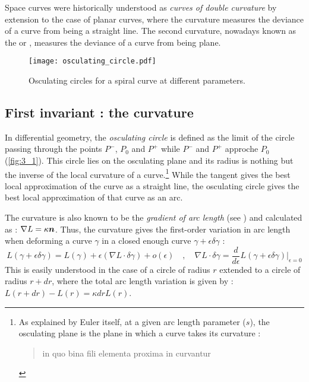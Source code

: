 Space curves were historically understood as \emph{curves of double curvature} by extension to the case of planar curves, where the curvature measures the deviance of a curve from being a straight line. The second curvature, nowadays known as the  or , measures the deviance of a curve from being plane. 


\begin{figure}[t]
	\centering
	\texttt{[image: osculating\_circle.pdf]}
	\caption{Osculating circles for a spiral curve at different parameters.}
	\label{fig:3_2}
\end{figure}

\subsection{First invariant : the curvature}\label{sec:curvature}
In differential geometry, the \emph{osculating circle} is defined as the limit of the circle passing through the points $P^-$, $P_0$ and $P^+$ while $P^-$ and $P^+$ approche $P_0$ (\cref{fig:3_1}). This circle lies on the osculating plane and its radius is nothing but the inverse of the local curvature of a curve.\footnote{ As explained by Euler itself, at a given arc length parameter ($s$), the osculating plane is the plane in which a curve takes its curvature : \blockcquote[p.364]{Euler1775}{in quo bina fili elementa proxima in curvantur}.} While the tangent gives the best local approximation of the curve as a straight line, the osculating circle gives the best local approximation of that curve as an arc.

The curvature is also known to be the \emph{gradient of arc length} (see \cite[p.4]{Vouga2014}) and calculated as : $\nabla{L} = \kappa \boldsymbol{n}$. Thus, the curvature gives the first-order variation in arc length when deforming a curve $\gamma$ in a closed enough curve $\gamma + \epsilon \delta\gamma$ :
\begin{equation}
	L(\gamma + \epsilon \delta\gamma) = L(\gamma) + \epsilon (\nabla L \cdot \delta\gamma) + o(\epsilon)
	\quad , \quad
	\nabla L \cdot \delta\gamma
	= \frac{d}{d\epsilon}L(\gamma+\epsilon \delta \gamma)\Bigr|_{\epsilon = 0}
\end{equation}
This is easily understood in the case of a circle of radius $r$ extended to a circle of radius $r+dr$, where the total arc length variation is given by : 
$L(r + dr) - L(r) = \kappa dr L(r) $.

